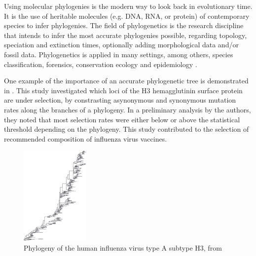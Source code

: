 Using molecular phylogenies is the modern way to look back in evolutionary time.
It is the use of heritable molecules (e.g. DNA, RNA, or protein)  
of contemporary species to infer phylogenies. 
The field of phylogenetics is the research discipline that
intends to infer the most accurate phylogenies possible, 
regarding topology, speciation and extinction times,
optionally adding morphological data and/or fossil data.
Phylogenetics is applied in many settings, among
others, species classification,
forensics, conservation ecology
and epidemiology \cite{lam2010use}.

One example of the importance of an accurate phylogenetic tree 
is demonstrated in \cite{bush1999positive}. This study
investigated which loci of the H3 hemagglutinin surface protein
are under selection, by constrasting asynonymous and synonymous
mutation rates along the branches of a phylogeny. 
In a preliminary analysis by the authors, they noted that
most selection rates were either below or above the 
statistical threshold depending on the phylogeny.
This study contributed to the selection of recommended 
composition of influenza virus vaccines.

\begin{figure}[H]
  \includegraphics[width=0.3\textwidth]{bush_et_al_1999}
  \caption{
    Phylogeny of the human influenza virus type A subtype H3,
    from \cite{bush1999positive}
  }
  \label{fig:bush_et_al_1999}
\end{figure}


